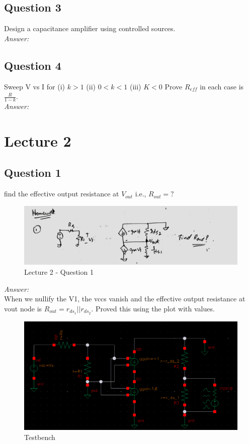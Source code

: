\documentclass[a4paper]{article}
\begin{document}
\subsection{Question 3}
Design a capacitance amplifier using controlled sources.\\

\textit{Answer: }\\

\subsection{Question 4}
Sweep V vs I for (i) $k>1$ (ii) $0<k<1$ (iii) $K<0$ Prove $R_{eff}$ in each case is $\frac{R}{1-k}$.\\
\textit{Answer: }\\

\section{Lecture 2}
\subsection{Question 1}
find the effective output resistance at $V_{out}$ i.e., $R_{out} = ?$ \\
\begin{figure}
    \centering
    \includegraphics[width=0.8\linewidth]{images/Lec_2_Q_1.jpeg}
    \caption{Lecture 2 - Question 1}
\end{figure}
\textit{Answer:}\\
When we nullify the V1, the vccs vanish and the effective output resistance at vout node is $R_{out} = r_{ds_1} || r_{ds_2}$. 
Proved this using the plot with values.

\begin{figure}
    \centering
    \includegraphics[width=1\linewidth]{images/Lec_2_Q_1_testbench.png}
    \caption{Testbench}
\end{figure}
\end{document}
